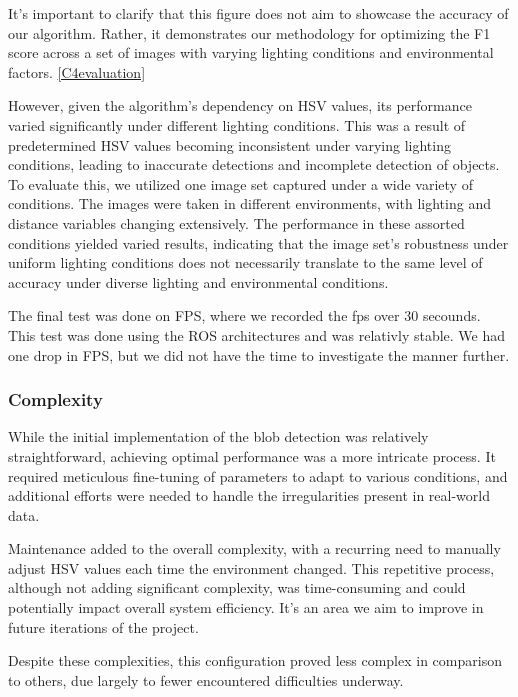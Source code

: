 It's important to clarify that this figure does not aim to showcase the accuracy of our algorithm. Rather, it demonstrates our methodology for optimizing the F1 score across a set of images with varying lighting conditions and environmental factors. \ref{C4evaluation}

However, given the algorithm's dependency on HSV values, its performance varied significantly under different lighting conditions.\cite{Config4Dataset} This was a result of predetermined HSV values becoming inconsistent under varying lighting conditions, leading to inaccurate detections and incomplete detection of objects. To evaluate this, we utilized one image set captured under a wide variety of conditions. The images were taken in different environments, with lighting and distance variables changing extensively. The performance in these assorted conditions yielded varied results, indicating that the image set's robustness under uniform lighting conditions does not necessarily translate to the same level of accuracy under diverse lighting and environmental conditions.

The final test was done on FPS, where we recorded the fps over 30 secounds. This test was done using the ROS architectures and was relativly stable. We had one drop in FPS, but we did not have the time to investigate the manner further.

\subsubsection{Complexity}

While the initial implementation of the blob detection was relatively straightforward, achieving optimal performance was a more intricate process. It required meticulous fine-tuning of parameters to adapt to various conditions, and additional efforts were needed to handle the irregularities present in real-world data.

Maintenance added to the overall complexity, with a recurring need to manually adjust HSV values each time the environment changed. This repetitive process, although not adding significant complexity, was time-consuming and could potentially impact overall system efficiency. It's an area we aim to improve in future iterations of the project.

Despite these complexities, this configuration proved less complex in comparison to others, due largely to fewer encountered difficulties underway.



